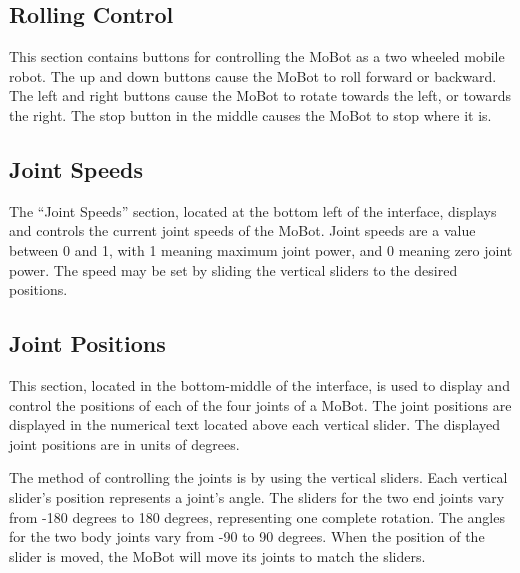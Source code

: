 \documentclass{article}
\begin{document}
\subsection{Rolling Control}
This section contains buttons for controlling the MoBot as a 
two wheeled mobile robot. The up and down buttons cause the MoBot to
roll forward or backward. The left and right buttons cause the MoBot 
to rotate towards the left, or towards the right. The stop button in the
middle causes the MoBot to stop where it is.

\subsection{Joint Speeds}
The ``Joint Speeds'' section, located at the bottom left of the interface,
displays and controls the current joint speeds of the MoBot. Joint speeds
are a value between 0 and 1, with 1 meaning maximum joint power, and 0
meaning zero joint power. The speed may be set by sliding the vertical 
sliders to the desired positions. 

\subsection{Joint Positions}
This section, located in the bottom-middle of the interface, is used to display
and control the positions of each of the four
joints of a MoBot. The joint positions are displayed in the numerical
text located above each vertical slider. The displayed joint positions are in
units of degrees.  

The method of controlling the joints is by using the vertical sliders.
Each vertical slider's position represents a joint's angle. The sliders for the
two end joints vary from -180 degrees to 180 degrees, representing one complete
rotation. The angles for the two body joints vary from -90 to 90 degrees. When
the position of the slider is moved, the MoBot will move its joints to match the 
sliders. 

\end{document}
